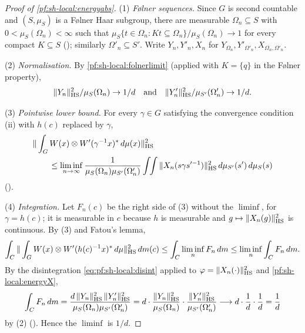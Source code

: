\begin{proof}[Proof of \cref{pf:sh-local:energyabs}]
(1) \emph{F\o lner sequences.} Since $G$ is second countable and $(S,\mu_S)$ is a F\o lner Haar subgroup, there are
measurable $\Omega_n\subseteq S$ with $0<\mu_S(\Omega_n)<\infty$ such that
$\mu_S\{t\in\Omega_n:Kt\subseteq\Omega_n\}/\mu_S(\Omega_n)\to1$ for every compact $K\subseteq S$
(); similarly $\Omega'_n\subseteq S'$. Write $Y_n,Y'_n,X_n$ for
$Y_{\Omega_n},Y'_{\Omega'_n},X_{\Omega_n,\Omega'_n}$.

(2) \emph{Normalisation.} By \cref{pf:sh-local:folnerlimit} (applied with $K=\{q\}$ in the F\o lner property),
\[
\|Y_n\|_{\mathrm{HS}}^2/\mu_S(\Omega_n)\to1/d\quad\text{and}\quad\|Y'_n\|_{\mathrm{HS}}^2/\mu_{S'}(\Omega'_n)\to1/d .
\]

(3) \emph{Pointwise lower bound.} For every $\gamma\in G$ satisfying the convergence condition (ii) with $h(c)$
replaced by $\gamma$,
\begin{align*}
&\|\int_GW(x)\otimes W'(\gamma^{-1}x)^*\,d\mu(x)\|_{\mathrm{HS}}^2\\
&\qquad\le\liminf_{n\to\infty}\frac1{\mu_S(\Omega_n)\mu_{S'}(\Omega'_n)}
\int\!\!\int\|X_n(s\gamma s'^{-1})\|_{\mathrm{HS}}^2\,d\mu_{S'}(s')\,d\mu_S(s)
\end{align*}
().

(4) \emph{Integration.} Let $F_n(c)$ be the right side of (3) without the $\liminf$, for $\gamma=h(c)$; it is
measurable in $c$ because $h$ is measurable and $g\mapsto\|X_n(g)\|_{\mathrm{HS}}^2$ is continuous. By (3) and Fatou's
lemma,
\[
\int_C\|\int_G W(x)\otimes W'(h(c)^{-1}x)^*\,d\mu\|_{\mathrm{HS}}^2\,dm(c)\le\int_C\liminf_nF_n\,dm\le\liminf_n\int_CF_n\,dm .
\]
By the disintegration \eqref{eq:pf:sh-local:disint} applied to $\varphi=\|X_n(\cdot)\|_{\mathrm{HS}}^2$ and
\cref{pf:sh-local:energyX},
\[
\int_CF_n\,dm=\frac{d\,\|Y_n\|_{\mathrm{HS}}^2\,\|Y'_n\|_{\mathrm{HS}}^2}{\mu_S(\Omega_n)\mu_{S'}(\Omega'_n)}
=d\cdot\frac{\|Y_n\|_{\mathrm{HS}}^2}{\mu_S(\Omega_n)}\cdot\frac{\|Y'_n\|_{\mathrm{HS}}^2}{\mu_{S'}(\Omega'_n)}\longrightarrow
d\cdot\frac1d\cdot\frac1d=\frac1d
\]
by (2) (). Hence the $\liminf$ is $1/d$.
\end{proof}

